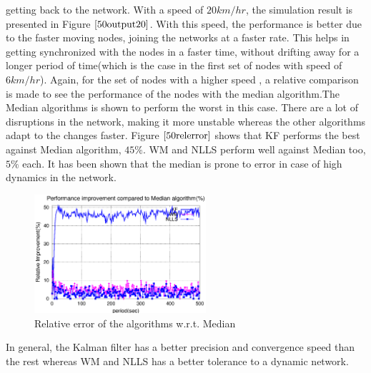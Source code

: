 \documentclass[journal]{IEEEtran}
\begin{document}
getting back to the network. \newline With a speed of $20km/hr$, the
simulation result is presented in Figure $\ref{50output20}$. With
this speed, the performance is better due to the faster moving
nodes, joining the networks at a faster rate. This helps in getting
synchronized with the nodes in a faster time, without drifting away
for a longer period of time(which is the case in the first set of
nodes with speed of $6km/hr$). Again, for the set of nodes with a
higher speed , a relative comparison is made to see the performance
of the nodes with the median algorithm.\newline The Median
algorithms is shown to perform the worst in this case. There are a
lot of disruptions in the network, making it more unstable whereas
the other algorithms adapt to the changes faster.\newline 
Figure $\ref{50relerror}$ shows that KF performs the best
against Median algorithm, $45\%$. WM and NLLS perform well against
Median too, $5\%$ each. It has been shown that the median is
prone to error in case of high dynamics in the network.
\begin{figure}
\centering \includegraphics[width=2.5in]{50output-error}
\caption{Relative error of the algorithms w.r.t. Median}
\label{50relerror}
\end{figure}
In general, the Kalman filter has a better precision and convergence
speed than the rest whereas WM and NLLS has a better tolerance to a dynamic network.
\end{document}
